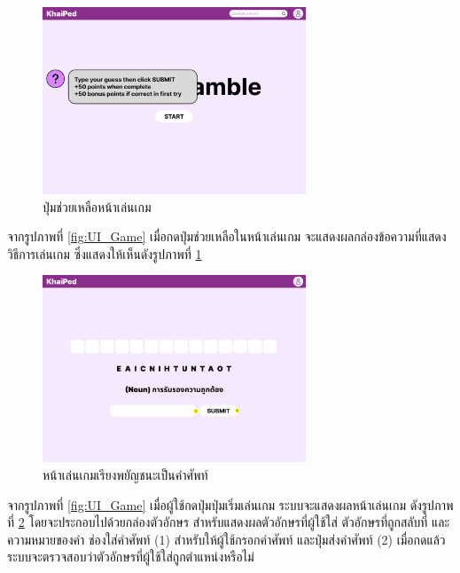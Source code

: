 \documentclass[12pt,oneside,openright,a4paper]{cpe-thai-project}
\begin{document}
\begin{figure}[!h]\centering
	\includegraphics[width=0.7\textwidth, keepaspectratio=true]{image/chap3/ui/game/Word Scramble - Help.png}
	\caption{ปุ่มช่วยเหลือหน้าเล่นเกม}\label{fig:UI_GameHelp}
\end{figure}
\hspace{1cm}
จากรูปภาพที่ \ref{fig:UI_Game} เมื่อกดปุ่มช่วยเหลือในหน้าเล่นเกม จะแสดงผลกล่องข้อความที่แสดงวิธีการเล่นเกม ซึ่งแสดงให้เห็นดังรูปภาพที่ \ref{fig:UI_GameHelp}

\pagebreak
\begin{figure}[!h]\centering
	\includegraphics[width=0.7\textwidth, keepaspectratio=true]{image/chap3/ui/game/Word Scramble - Start.png}
	\caption{หน้าเล่นเกมเรียงพยัญชนะเป็นคำศัพท์}\label{fig:UI_StartGame}
\end{figure}
\hspace{1cm}
จากรูปภาพที่ \ref{fig:UI_Game} เมื่อผู้ใช้กดปุ่มปุ่มเริ่มเล่นเกม ระบบจะแสดงผลหน้าเล่นเกม ดังรูปภาพที่ \ref{fig:UI_StartGame}
โดยจะประกอบไปด้วยกล่องตัวอักษร สำหรับแสดงผลตัวอักษรที่ผู้ใช้ใส่ ตัวอักษรที่ถูกสลับที่
และความหมายของคำ ช่องใส่คำศัพท์ (1) สำหรับให้ผู้ใช้กรอกคำศัพท์ และปุ่มส่งคำศัพท์ (2) เมื่อกดแล้วระบบจะตรวจสอบว่าตัวอักษรที่ผู้ใช้ใส่ถูกตำแหน่งหรือไม่
\end{document}
